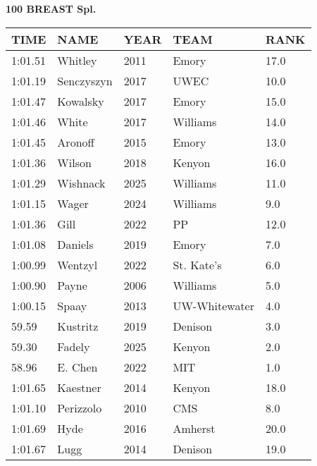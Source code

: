 \begin{table}[H]
\centering
\begin{minipage}[t]{0.6\textwidth}
\centering
\textbf{100 BREAST Spl.}\\[0.1cm]
\begin{tabular}{@{}p{1.8cm}p{2.8cm}p{1.2cm}p{1.4cm}p{0.8cm}@{}}
\hline
    \textbf{TIME} & \textbf{NAME} & \textbf{YEAR} & \textbf{TEAM} & \textbf{RANK} \\
\hline
    1:01.51 & Whitley & 2011 & Emory & 17.0 \\
    1:01.19 & Senczyszyn & 2017 & UWEC & 10.0 \\
    1:01.47 & Kowalsky & 2017 & Emory & 15.0 \\
    1:01.46 & White & 2017 & Williams & 14.0 \\
    1:01.45 & Aronoff & 2015 & Emory & 13.0 \\
    1:01.36 & Wilson & 2018 & Kenyon & 16.0 \\
    1:01.29 & Wishnack & 2025 & Williams & 11.0 \\
    1:01.15 & Wager & 2024 & Williams & 9.0 \\
    1:01.36 & Gill & 2022 & PP & 12.0 \\
    1:01.08 & Daniels & 2019 & Emory & 7.0 \\
    1:00.99 & Wentzyl & 2022 & St. Kate's & 6.0 \\
    1:00.90 & Payne & 2006 & Williams & 5.0 \\
    1:00.15 & Spaay & 2013 & UW-Whitewater & 4.0 \\
    59.59 & Kustritz & 2019 & Denison & 3.0 \\
    59.30 & Fadely & 2025 & Kenyon & 2.0 \\
    58.96 & E. Chen & 2022 & MIT & 1.0 \\
    1:01.65 & Kaestner & 2014 & Kenyon & 18.0 \\
    1:01.10 & Perizzolo & 2010 & CMS & 8.0 \\
    1:01.69 & Hyde & 2016 & Amherst & 20.0 \\
    1:01.67 & Lugg & 2014 & Denison & 19.0 \\
\hline
\end{tabular}
\end{minipage}
\end{table}

